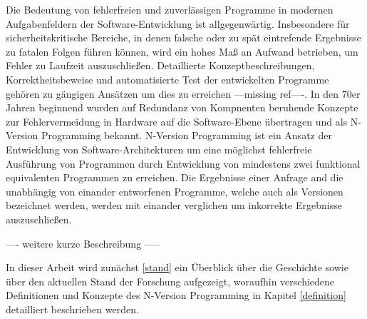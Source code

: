 Die Bedeutung von fehlerfreien und zuverlässigen Programme in modernen Aufgabenfeldern der Software-Entwicklung ist allgegenwärtig.
Insbesondere für sicherheitskritische Bereiche, in denen falsche oder zu spät eintrefende Ergebnisse zu fatalen Folgen führen können, wird ein hohes Maß an Aufwand betrieben, um Fehler zu Laufzeit auszuschließen.
Detaillierte Konzeptbeschreibungen, Korrektheitsbeweise und automatisierte Test der entwickelten Programme gehören zu gängigen Ansätzen um dies zu erreichen ---missing ref----.
In den 70er Jahren beginnend wurden auf Redundanz von Kompnenten beruhende Konzepte zur Fehlervermeidung in Hardware auf die Software-Ebene übertragen und als N-Version Programming bekannt.
N-Version Programming ist ein Ansatz der Entwicklung von Software-Architekturen um eine möglichst fehlerfreie Ausführung von Programmen durch Entwicklung von mindestens zwei funktional equivalenten Programmen zu erreichen.
Die Ergebnisse einer Anfrage and die unabhängig von einander entworfenen Programme, welche auch als Versionen bezeichnet werden, werden mit einander verglichen um inkorrekte Ergebnisse auszuschließen.

---- weitere kurze Beschreibung -----


In dieser Arbeit wird zunächst \ref{stand} ein Überblick über die Geschichte sowie über den aktuellen Stand der Forschung aufgezeigt, woraufhin verschiedene Definitionen und Konzepte des N-Version Programming in Kapitel \ref{definition} detailliert beschrieben werden.